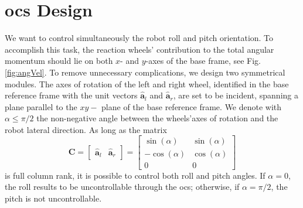 \documentclass[journal,letterpaper]{IEEEtran}
\begin{document}
\section{\acrshort{ocs} Design}
We want to control simultaneously the robot roll and pitch orientation.
To accomplish this task, the reaction wheels' contribution to the total angular momentum should lie on both $x$- and $y$-axes of the base frame, see Fig. \ref{fig:angVel}. 
To remove unnecessary complications, we design two symmetrical modules. The axes of rotation of the left and right wheel, identified in the base reference frame with the unit vectors $\hat{\bm{a}}_l$ and $\hat{\bm{a}}_r$, are set to be incident, spanning a plane parallel to the $xy-$ plane of the base reference frame. We denote with $\alpha \leq \pi/2$ the non-negative angle between the wheels'axes of rotation and the robot lateral direction. As long as the matrix
\begin{equation}
	\bm{C} = 
	\left[ \begin{array}{cc}
	\hat{\bm{a}}_l & \hat{\bm{a}}_r
	\end{array} \right] = 
	\left[ \begin{array}{cc}
	\sin(\alpha) & \sin(\alpha) \\
	-\cos(\alpha) & \cos(\alpha) \\
	0 & 0
	\end{array} \right]
\end{equation}
is full column rank, it is possible to control both roll and pitch angles. If $\alpha = 0$, the roll results to be uncontrollable through the \acrshort{ocs}; otherwise, if $\alpha = \pi/2$, the pitch is not uncontrollable.
%
\end{document}
